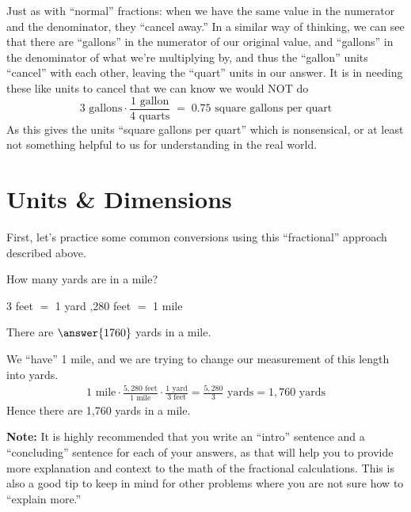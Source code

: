 \documentclass[12pt]{ximera}
\begin{document}
Just as with ``normal'' fractions: when we have the same value in the numerator and the
denominator, they ``cancel away.'' In a similar way of thinking, we can see that there
are ``gallons'' in the numerator of our original value, and ``gallons'' in the
denominator of what we're multiplying by, and thus the ``gallon'' units ``cancel'' with
each other, leaving the ``quart'' units in our answer. It is in needing these like
units to cancel that we can know we would NOT do
\[
3\text{ gallons} \cdot \frac{1\text{ gallon}}{4\text{ quarts}} \;=\; 0.75\text{ square gallons per quart}
\]
As this gives the units ``square gallons per quart'' which is nonsensical, or at least
not something helpful to us for understanding in the real world.

\section*{Units \& Dimensions}

First, let's practice some common conversions using this ``fractional'' approach
described above.

\begin{problem}
How many yards are in a mile?

\hspace{1em} 3 feet $=$ 1 yard ,280 feet $=$ 1 mile

There are $\answer{1760}$ yards in a mile.

\begin{freeResponse}
\end{freeResponse}

\begin{solution}
We ``have'' 1 mile, and we are trying to change our measurement of this length into
yards.
\begin{gather*}
1\text{ mile} \cdot \frac{5{,}280\text{ feet}}{1\text{ mile}} \cdot \frac{1\text{ yard}}{3\text{ feet}}
= \frac{5{,}280}{3}\text{ yards} = 1{,}760\text{ yards}
\end{gather*}
Hence there are 1,760 yards in a mile.

\textbf{Note:} It is highly recommended that you write an ``intro'' sentence and a
``concluding'' sentence for each of your answers, as that will help you to provide more
explanation and context to the math of the fractional calculations. This is also a good
tip to keep in mind for other problems where you are not sure how to ``explain more.''
\end{solution}
\end{problem}
\end{document}
